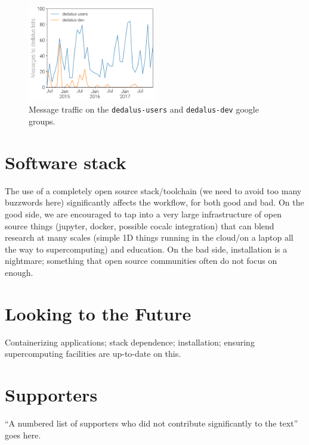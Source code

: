 \documentclass[12pt, titlepage]{aastex62}
\begin{document}
\begin{figure}
  \centering
  \includegraphics[width=0.5\textwidth]{../figs/message_counts.png}
  \caption{Message traffic on the \texttt{dedalus-users} and \texttt{dedalus-dev} google groups.}
  \label{fig:messages}
\end{figure}

\section{Software stack}
\label{sec:stack}

The use of a completely open source stack/toolchain (we need to avoid too many buzzwords here) significantly affects the workflow, for both good and bad. On the good side, we are encouraged to tap into a very large infrastructure of open source things (jupyter, docker, possible cocalc integration) that can blend research at many scales (simple 1D things running in the cloud/on a laptop all the way to supercomputing) and education. On the bad side, installation is a nightmare; something that open source communities often do not focus on enough.

\section{Looking to the Future}
\label{sec:future}

Containerizing applications; stack dependence; installation; ensuring supercomputing facilities are up-to-date on this.
\appendix

\section{Supporters}
\label{sec:supporters}

``A numbered list of supporters who did not contribute significantly to the text'' goes here.

{\footnotesize
%

}
\end{document}

